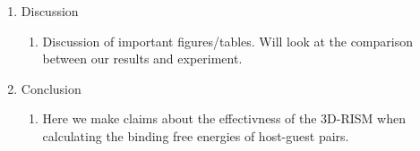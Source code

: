 \documentclass{article}
\begin{document}
\begin{enumerate}
	\item Discussion
	\begin{enumerate}
		\item Discussion of important figures/tables. Will look at the comparison between our results and experiment.
	\end{enumerate}
	\item Conclusion
	\begin{enumerate}
		\item Here we make claims about the effectivness of the 3D-RISM when calculating the binding free energies of host-guest pairs.
	\end{enumerate}
\end{enumerate}
\end{document}
